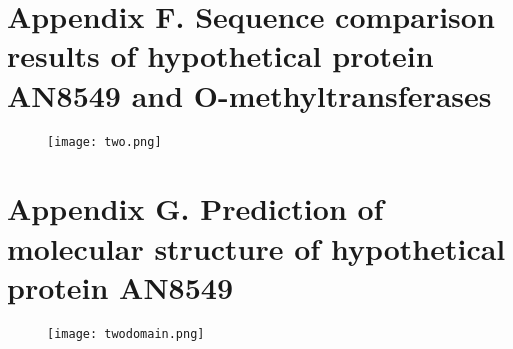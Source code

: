 \documentclass[a4paper,10pt]{article}
\begin{document}
\begin{appendices}
\section*{Appendix F. Sequence comparison results of hypothetical protein AN8549 and O-methyltransferases}\label{secF}

\begin{figure}[H]
\centering
\texttt{[image: two.png]}
\end{figure}


\section*{Appendix G. Prediction of molecular structure of hypothetical protein AN8549\cite{jumper2021highly}\cite{varadi2022alphafold}}\label{secG}

\begin{figure}[H]
\centering
\texttt{[image: twodomain.png]}
\end{figure}



\end{appendices}


\end{document}
